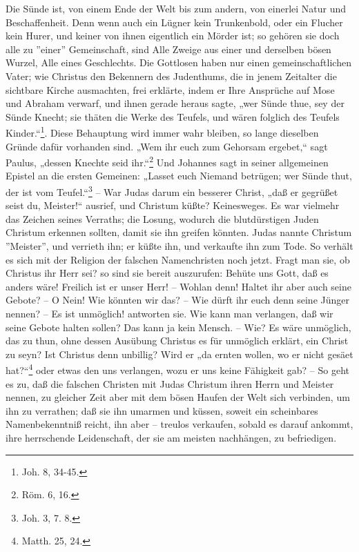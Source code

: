 Die Sünde ist, von einem Ende der Welt bis zum andern, von einerlei Natur und Beschaffenheit. Denn wenn auch ein Lügner kein Trunkenbold, oder ein Flucher kein Hurer, und keiner von ihnen eigentlich ein Mörder ist; so gehören sie doch alle zu ''einer'' Gemeinschaft, sind Alle Zweige aus einer und derselben bösen Wurzel, Alle eines Geschlechts. Die Gottlosen haben nur einen gemeinschaftlichen Vater; wie Christus den Bekennern des Judenthums, die in jenem Zeitalter die sichtbare Kirche ausmachten, frei erklärte, indem er Ihre Ansprüche auf Mose und Abraham verwarf, und ihnen gerade heraus sagte, „wer Sünde thue, sey der Sünde Knecht; sie thäten die Werke des Teufels, und wären folglich des Teufels Kinder.“\footnote{Joh. 8, 34-45.}. Diese Behauptung wird immer wahr bleiben, so lange dieselben Gründe dafür vorhanden sind. „Wem ihr euch zum Gehorsam ergebet,“ sagt Paulus, „dessen Knechte seid ihr.“\footnote{Röm. 6, 16.} Und Johannes sagt in seiner allgemeinen Epistel an die ersten Gemeinen: „Lasset euch Niemand betrügen; wer Sünde thut, der ist vom Teufel.“\footnote{Joh. 3, 7. 8.} – War Judas darum ein besserer Christ, „daß er gegrüßet seist du, Meister!“ ausrief, und Christum küßte? Keinesweges. Es war vielmehr das Zeichen seines Verraths; die Losung, wodurch die blutdürstigen Juden Christum erkennen sollten, damit sie ihn greifen könnten. Judas nannte Christum ''Meister'', und verrieth ihn; er küßte ihn, und verkaufte ihn zum Tode. So verhält es sich mit der Religion der falschen Namenchristen noch jetzt. Fragt man sie, ob Christus ihr Herr sei? so sind sie bereit auszurufen: Behüte uns Gott, daß es anders wäre! Freilich ist er unser Herr! – Wohlan denn! Haltet ihr aber auch seine Gebote? – O Nein! Wie könnten wir das? – Wie dürft ihr euch denn seine Jünger nennen? – Es ist unmöglich! antworten sie. Wie kann man verlangen, daß wir seine Gebote halten sollen? Das kann ja kein Mensch. – Wie? Es wäre unmöglich, das zu thun, ohne dessen Ausübung Christus es für unmöglich erklärt, ein Christ zu seyn? Ist Christus denn unbillig? Wird er „da ernten wollen, wo er nicht gesäet hat?“\footnote{Matth. 25, 24.} oder etwas den uns verlangen, wozu er uns keine Fähigkeit gab? – So geht es zu, daß die falschen Christen mit Judas Christum ihren Herrn und Meister nennen, zu gleicher Zeit aber mit dem bösen Haufen der Welt sich verbinden, um ihn zu verrathen; daß sie ihn umarmen und küssen, soweit ein scheinbares Namenbekenntniß reicht, ihn aber – treulos verkaufen, sobald es darauf ankommt, ihre herrschende Leidenschaft, der sie am meisten nachhängen, zu befriedigen.

